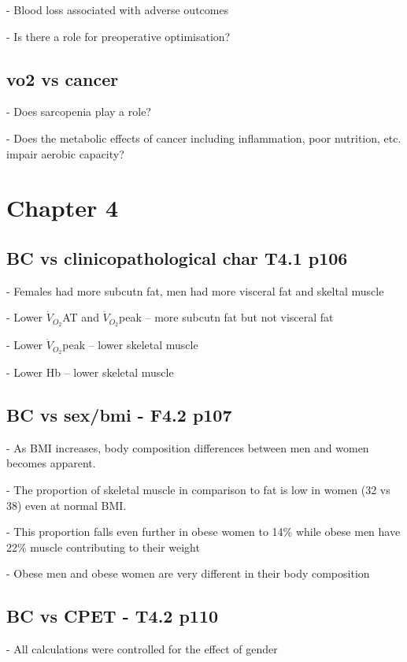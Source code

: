 \documentclass[12pt,a4paper]{article}
\begin{document}
	- Blood loss associated with adverse outcomes

	- Is there a role for preoperative optimisation?
	
\subsection{vo2 vs cancer}
- Does sarcopenia play a role?

- Does the metabolic effects of cancer including inflammation, poor nutrition, etc. impair aerobic capacity?

\clearpage

\section{Chapter 4}

\subsection{BC vs clinicopathological char T4.1 p106}

- Females had more subcutn fat, men had more visceral fat and skeltal muscle

- Lower $\dot{V}_{O_2}$AT and $\dot{V}_{O_2}$peak -- more subcutn fat but not visceral fat

- Lower $\dot{V}_{O_2}$peak -- lower skeletal muscle

- Lower Hb -- lower skeletal muscle

\subsection{BC vs sex/bmi - F4.2 p107}

- As BMI increases, body composition differences between men and women becomes apparent.

- The proportion of skeletal muscle in comparison to fat is low in women (32 vs 38) even at normal BMI. 

- This proportion falls even further in obese women to 14\% while obese men have 22\% muscle contributing to their weight

- Obese men and obese women are very different in their body composition

\subsection{BC vs CPET - T4.2 p110}

- All calculations were controlled for the effect of gender
\end{document}
